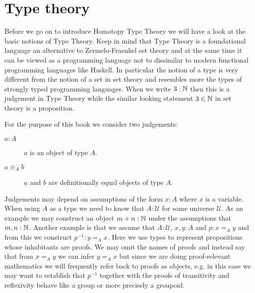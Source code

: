 \newcommand{\stype}{{\;\sf type}}
\newcommand{\rec}{{\sf rec}}
\newcommand{\bool}{{\bf B}}
\newcommand{\app}{{\sf app}}
\newcommand{\pair}{{\sf pair}}
\newcommand{\inleft}{{\sf inleft}}
\newcommand{\inright}{{\sf inright}}
\newcommand{\emptyt}{{\bf 0}}
\newcommand{\unitt}{{\bf 1}}
\newcommand{\UU}{{\mathcal U}}

\chapter{Type theory}
\label{cha:typetheory}

Before we go on to introduce Homotopy Type Theory we will have a look at
the basic notions of Type Theory. Keep in mind that Type Theory is a
foundational language an alternative to Zermelo-Fraenkel set theory
and at the same time it can be viewed as a programming language not to
dissimilar to modern functional programming languages like Haskell. In
particular the notion of a type is very different from the notion of a
set in set theory and resembles more the types of strongly typed
programming languages. When we write $3 : \mathbb{N}$ then this is a
judgement in Type Theory while the similar looking statement $3 \in
\mathbb{N}$ in set theory is a proposition. 

For the purpose of this book we consider two judgements:
\begin{description}
\item[$a : A$] $a$ is an object of type $A$.
\item[$a \equiv_A b$] $a$ and $b$ are definitionally equal 
  objects of type $A$.
\end{description}
Judgements may depend on assumptions of the form $x:A$ where $x$ is a
variable. When using $A$ as a type we need to know that $A:\UU$ for
some universe $\UU$. As an example we may construct an object $m + n :
\mathbb{N}$ under the assumptions that $m,n : \mathbb{N}$. Another example is that
we assume that $A : \UU$, $x,y : A$ and $p : x =_A y$ and from this we
construct $p^{-1} : y =_A x$. Here we use types to represent
propositions whose inhabitants are proofs. We may omit the names of
proofs and instead say that from $x =_A y$ we can infer $y =_A x$ but
since we are doing proof-relevant mathematics we will frequently refer
back to proofs as objects, e.g. in this case we may want to establish
that $p^{-1}$ together with the proofs of transitivity and reflexivity
behave like a group or more precisely a groupoid.


